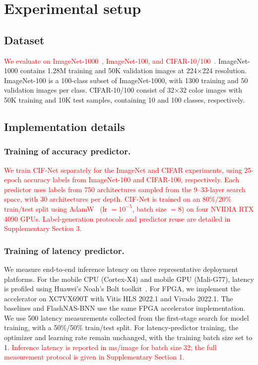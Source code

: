 \documentclass[a4paper,fleqn]{cas-sc}
\begin{document}
\section{Experimental setup}
\subsection{Dataset}
\textcolor{red}{We evaluate on ImageNet-1000~\cite{Deng2009}, ImageNet-100, and CIFAR-10/100~\cite{Krizhevsky2009}.} ImageNet-1000 contains 1.28M training and 50K validation images at 224$\times$224 resolution. ImageNet-100 is a 100-class subset of ImageNet-1000, with 1300 training and 50 validation images per class. CIFAR-10/100 consist of 32$\times$32 color images with 50K training and 10K test samples, containing 10 and 100 classes, respectively.

\subsection{Implementation details}

\subsubsection{Training of accuracy predictor.} 
\textcolor{red}{We train CIF-Net separately for the ImageNet and CIFAR experiments, using 25-epoch accuracy labels from ImageNet-100 and CIFAR-100, respectively. Each predictor uses labels from 750 architectures sampled from the 9--33-layer search space, with 30 architectures per depth. CIF-Net is trained on an 80\%/20\% train/test split using AdamW~\cite{Loshchilov2019} (lr $=10^{-5}$, batch size $=8$) on four NVIDIA RTX 4090 GPUs. Label-generation protocols and predictor reuse are detailed in Supplementary Section 3.}

\subsubsection{Training of latency predictor.} 
We measure end-to-end inference latency on three representative deployment platforms. For the mobile CPU (Cortex-X4) and mobile GPU (Mali-G77), latency is profiled using Huawei's Noah's Bolt toolkit~\cite{Huawei2020}. For FPGA, we implement the accelerator on XC7VX690T with Vitis HLS 2022.1 and Vivado 2022.1. The baselines and FlashNAS-BNN use the same FPGA accelerator implementation. We use 500 latency measurements collected from the first-stage search for model training, with a 50\%/50\% train/test split. For latency-predictor training, the optimizer and learning rate remain unchanged, with the training batch size set to 1. \textcolor{red}{Inference latency is reported in ms/image for batch size 32; the full measurement protocol is given in Supplementary Section 1.}
\end{document}
